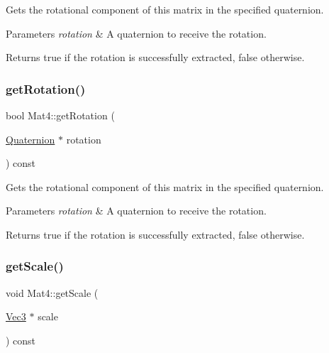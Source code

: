 Gets the rotational component of this matrix in the specified quaternion.


\begin{DoxyParams}{Parameters}
{\em rotation} & A quaternion to receive the rotation.\\
\hline
\end{DoxyParams}
\begin{DoxyReturn}{Returns}
true if the rotation is successfully extracted, false otherwise. 
\end{DoxyReturn}
\mbox{\label{classMat4_a585ebfce44ed9fd746a81bfed1e3cccf}} 
\subsubsection{\texorpdfstring{get\+Rotation()}{getRotation()}\hspace{0.1cm}{\footnotesize\ttfamily [2/2]}}
{\footnotesize\ttfamily bool Mat4\+::get\+Rotation (\begin{DoxyParamCaption}\item[{\hyperlink{classQuaternion}{Quaternion} $\ast$}]{rotation }\end{DoxyParamCaption}) const}

Gets the rotational component of this matrix in the specified quaternion.


\begin{DoxyParams}{Parameters}
{\em rotation} & A quaternion to receive the rotation.\\
\hline
\end{DoxyParams}
\begin{DoxyReturn}{Returns}
true if the rotation is successfully extracted, false otherwise. 
\end{DoxyReturn}
\mbox{\label{classMat4_a6e71ae3f0286e5ea417f237aa0cdefeb}} 
\subsubsection{\texorpdfstring{get\+Scale()}{getScale()}\hspace{0.1cm}{\footnotesize\ttfamily [1/2]}}
{\footnotesize\ttfamily void Mat4\+::get\+Scale (\begin{DoxyParamCaption}\item[{\hyperlink{classVec3}{Vec3} $\ast$}]{scale }\end{DoxyParamCaption}) const}

